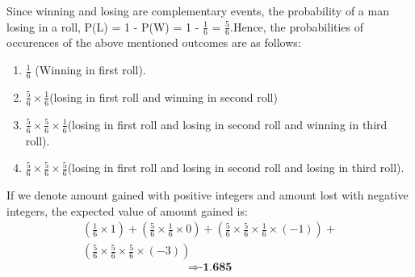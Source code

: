 \documentclass[journal,12pt,twocolumn]{IEEEtran}
\begin{document}
Since winning and losing are complementary events, the probability of a man losing in a roll, P(L) = 1 - P(W) = 1 - $\frac{1}{6}$ = $\frac{5}{6}$.\newline Hence, the probabilities of occurences of the above mentioned outcomes are as follows:
\begin{enumerate}
    \item $\frac{1}{6}$ (Winning in first roll).
    \item $\frac{5}{6} \times \frac{1}{6}$(losing in first roll and winning in second roll)
    \item $\frac{5}{6} \times \frac{5}{6} \times \frac{1}{6}$(losing in first roll and losing in second roll and winning in third roll).
    \item $\frac{5}{6} \times \frac{5}{6} \times \frac{5}{6}$(losing in first roll and losing in second roll and losing in third roll).
\end{enumerate}
If we denote amount gained with positive integers and amount lost with negative integers, the expected value of amount gained is:
\begin{multline}\nonumber
    \left(\frac{1}{6} \times 1 \right)+\left( \frac{5}{6}\times \frac{1}{6} \times 0  \right)+ \left(\frac{5}{6} \times \frac{5}{6}\times \frac{1}{6}\times (-1)  \right)+\\
    \left( \frac{5}{6}\times \frac{5}{6}\times \frac{5}{6}\times (-3) \right)
\end{multline}
$$\Rightarrow \textbf{-1.685}$$
\end{document}
